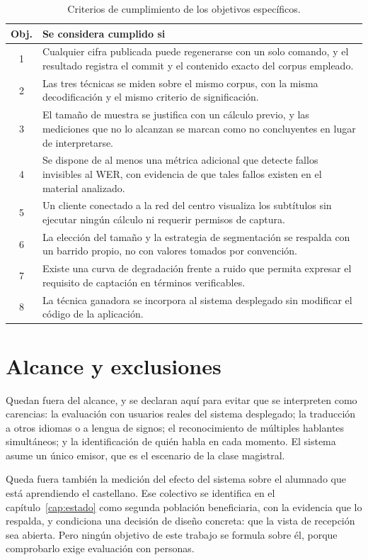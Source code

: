 \begin{table}[h]
\centering
\small
\begin{tabular}{|c|p{10.5cm}|}
\hline
\textbf{Obj.} & \textbf{Se considera cumplido si} \\
\hline
1 & Cualquier cifra publicada puede regenerarse con un solo comando, y el resultado
    registra el commit y el contenido exacto del corpus empleado. \\
\hline
2 & Las tres técnicas se miden sobre el mismo corpus, con la misma decodificación y el
    mismo criterio de significación. \\
\hline
3 & El tamaño de muestra se justifica con un cálculo previo, y las mediciones que no lo
    alcanzan se marcan como no concluyentes en lugar de interpretarse. \\
\hline
4 & Se dispone de al menos una métrica adicional que detecte fallos invisibles al WER, con
    evidencia de que tales fallos existen en el material analizado. \\
\hline
5 & Un cliente conectado a la red del centro visualiza los subtítulos sin ejecutar ningún
    cálculo ni requerir permisos de captura. \\
\hline
6 & La elección del tamaño y la estrategia de segmentación se respalda con un barrido
    propio, no con valores tomados por convención. \\
\hline
7 & Existe una curva de degradación frente a ruido que permita expresar el requisito de
    captación en términos verificables. \\
\hline
8 & La técnica ganadora se incorpora al sistema desplegado sin modificar el código de la
    aplicación. \\
\hline
\end{tabular}
\caption{Criterios de cumplimiento de los objetivos específicos.}
\label{tab:criterios}
\end{table}

\section{Alcance y exclusiones}

Quedan fuera del alcance, y se declaran aquí para evitar que se interpreten como
carencias: la evaluación con usuarios reales del sistema desplegado; la traducción a otros
idiomas o a lengua de signos; el reconocimiento de múltiples hablantes simultáneos; y la
identificación de quién habla en cada momento. El sistema asume un único emisor, que es el
escenario de la clase magistral.

Queda fuera también la medición del efecto del sistema sobre el alumnado que está
aprendiendo el castellano. Ese colectivo se identifica en el capítulo~\ref{cap:estado} como
segunda población beneficiaria, con la evidencia que lo respalda, y condiciona una decisión
de diseño concreta: que la vista de recepción sea abierta. Pero ningún objetivo de este
trabajo se formula sobre él, porque comprobarlo exige evaluación con personas.
